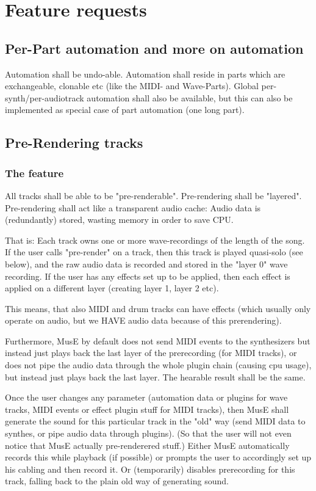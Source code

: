 \documentclass[a4paper]{report}
\begin{document}
\chapter{Feature requests}
\section{Per-Part automation and more on automation}                       %
Automation shall be undo-able. Automation shall reside in parts which
are exchangeable, clonable etc (like the MIDI- and Wave-Parts).
Global per-synth/per-audiotrack automation shall also be available, but
this can also be implemented as special case of part automation (one
long part).

\section{Pre-Rendering tracks}
\subsection{The feature}
All tracks shall be able to be "pre-renderable". Pre-rendering shall
be "layered". Pre-rendering shall act like a transparent audio cache:
Audio data is (redundantly) stored, wasting memory in order to save CPU.

That is: Each track owns one or more wave-recordings of the length of
the song. If the user calls "pre-render" on a track, then this track
is played quasi-solo (see below), and the raw audio data is recorded
and stored in the "layer 0" wave recording. If the user has any effects
set up to be applied, then each effect is applied on a different layer
(creating layer 1, layer 2 etc).

This means, that also MIDI and drum tracks can have effects (which
usually only operate on audio, but we HAVE audio data because of this
prerendering).

Furthermore, MusE by default does not send MIDI events to the synthesizers
but instead just plays back the last layer of the prerecording (for
MIDI tracks), or does not pipe the audio data through the whole plugin
chain (causing cpu usage), but instead just plays back the last layer.
The hearable result shall be the same.

Once the user changes any parameter (automation data or plugins for
wave tracks, MIDI events or effect plugin stuff for MIDI tracks),
then MusE shall generate the sound for this particular track in the
"old" way (send MIDI data to synthes, or pipe audio data through plugins).
(So that the user will not even notice that MusE actually pre-renderered
stuff.) Either MusE automatically records this while playback (if possible)
or prompts the user to accordingly set up his cabling and then record
it. Or (temporarily) disables prerecording for this track, falling back
to the plain old way of generating sound.
\end{document}
